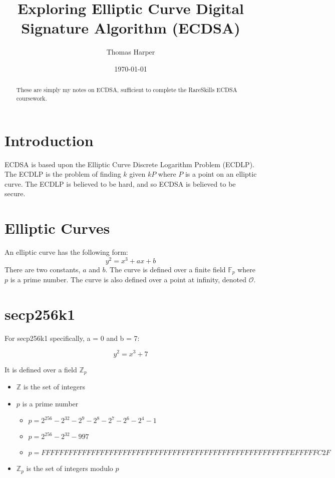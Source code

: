 \documentclass[12pt]{article}
\title{Exploring Elliptic Curve Digital Signature Algorithm (ECDSA)}
\author{Thomas Harper}
\date{\today}
\begin{document}
\maketitle

\begin{abstract}

These are simply my notes on ECDSA, sufficient to complete the RareSkills ECDSA coursework.

\end{abstract}

\section{Introduction}

ECDSA is based upon the Elliptic Curve Discrete Logarithm Problem (ECDLP). The ECDLP is the problem of finding $k$ given $kP$ where $P$ is a point on an elliptic curve. The ECDLP is believed to be hard, and so ECDSA is believed to be secure.

\section{Elliptic Curves}

An elliptic curve has the following form:
$$y^2 = x^3 + ax + b$$
There are two constants, $a$ and $b$. The curve is defined over a finite field $\mathbb{F}_p$ where $p$ is a prime number. The curve is also defined over a point at infinity, denoted $\mathcal{O}$.

\section{secp256k1}

For secp256k1 specifically, a = 0 and b = 7:

$$y^2 = x^3 + 7$$

It is defined over a field $\mathbb{Z}_p$
\begin{itemize}
\item $\mathbb{Z}$ is the set of integers
\item $p$ is a prime number
    \begin{itemize}
        \item[\ding{223}] $p = 2^{256} - 2^{32} - 2^9 - 2^8 - 2^7 - 2^6 - 2^4 - 1$
        \item[\ding{223}] $p = 2^{256} - 2^{32} - 997$
        \item[\ding{223}] $p = FFFFFFFF FFFFFFFF FFFFFFFF FFFFFFFF FFFFFFFF FFFFFFFF FFFFFFFE FFFFFC2F$
    \end{itemize}
\item $\mathbb{Z}_p$ is the set of integers modulo $p$
\end{itemize}



\end{document}
